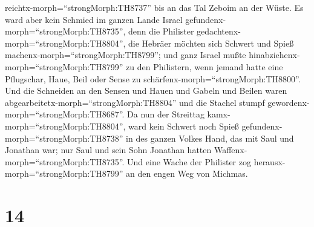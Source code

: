 reichtx-morph=``strongMorph:TH8737'' bis an das Tal Zeboim an der Wüste.
 Es ward aber kein Schmied im ganzen Lande Israel
gefundenx-morph=``strongMorph:TH8735'', denn die Philister
gedachtenx-morph=``strongMorph:TH8804'', die Hebräer möchten sich
Schwert und Spieß machenx-morph=``strongMorph:TH8799''; 
und ganz Israel mußte hinabziehenx-morph=``strongMorph:TH8799'' zu den
Philistern, wenn jemand hatte eine Pflugschar, Haue, Beil oder Sense zu
schärfenx-morph=``strongMorph:TH8800''.  Und die Schneiden
an den Sensen und Hauen und Gabeln und Beilen waren
abgearbeitetx-morph=``strongMorph:TH8804'' und die Stachel stumpf
gewordenx-morph=``strongMorph:TH8687''.  Da nun der
Streittag kamx-morph=``strongMorph:TH8804'', ward kein Schwert noch
Spieß gefundenx-morph=``strongMorph:TH8738'' in des ganzen Volkes Hand,
das mit Saul und Jonathan war; nur Saul und sein Sohn Jonathan hatten
Waffenx-morph=``strongMorph:TH8735''.  Und eine Wache der
Philister zog herausx-morph=``strongMorph:TH8799'' an den engen Weg von
Michmas.

\hypertarget{section-13}{%
\section{14}\label{section-13}}

